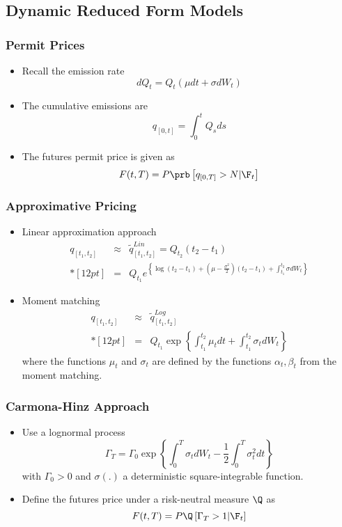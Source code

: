 {{{{{{{{\subsection{Dynamic Reduced Form Models}
\begin{frame}
\frametitle{Permit Prices}
\begin{itemize}
\item<1-> Recall the emission rate
$$
dQ_t = Q_t(\mu dt + \sigma dW_t)
$$
\item<2->
The cumulative emissions are
$$
q_{[0,t]} = \int_0^t Q_s ds
$$
\item<3->
The futures permit price is given as
$$
F(t,T) = P \prb\left[q_{[0,T]}>N |\F_t\right]
$$
\end{itemize}
\end{frame}

\begin{frame}
\frametitle{Approximative Pricing}
\begin{itemize}
\item<1-> Linear approximation approach
$$
\begin{array}{lll}
q_{[t_1,t_2]} &\approx& \tilde{q}^{Lin}_{[t_1,t_2]} = Q_{t_2} (t_2 - t_1) \\*[12pt]
&=&\displaystyle   Q_{t_1} e^{\left\{\log (t_2 - t_1) + \left(\mu-\frac{\sigma^2}{2}\right)(t_2-t_1)+\int_{t_1}^{t_2}\sigma dW_t\right\}}
\end{array}
$$
\item<2-> Moment matching
$$
\begin{array}{lll}
q_{[t_1,t_2]} &\approx& \tilde{q}^{Log}_{[t_1,t_2]}\\*[12pt]
&=& Q_{t_1} \exp\left\{ \int_{t_1}^{t_2}\mu_t dt + \int_{t_1}^{t_2} \sigma_t dW_t\right\}
\end{array}
$$
where the functions $\mu_t$ and $\sigma_t$ are defined by the functions $\alpha_t, \beta_t$ from the moment matching.
\end{itemize}
\end{frame}

\begin{frame}
\frametitle{Carmona-Hinz Approach}
\begin{itemize}
\item<1-> Use a lognormal process
$$
\Gamma_{T}= \Gamma_0  \exp{\left\{\int_{0}^{T}\sigma_t dW_t -\frac{1}{2}\int_0^T \sigma^2_t dt\right\}}
$$
with $\Gamma_0 >0$ and $\sigma(.)$ a deterministic square-integrable function.
\item<2-> Define the futures price under a risk-neutral measure $\Q$ as
$$
F(t,T) = P \Q\left[\Gamma_T>1 |\F_t\right]
$$
\end{itemize}
\end{frame}

}}}}}}}}

